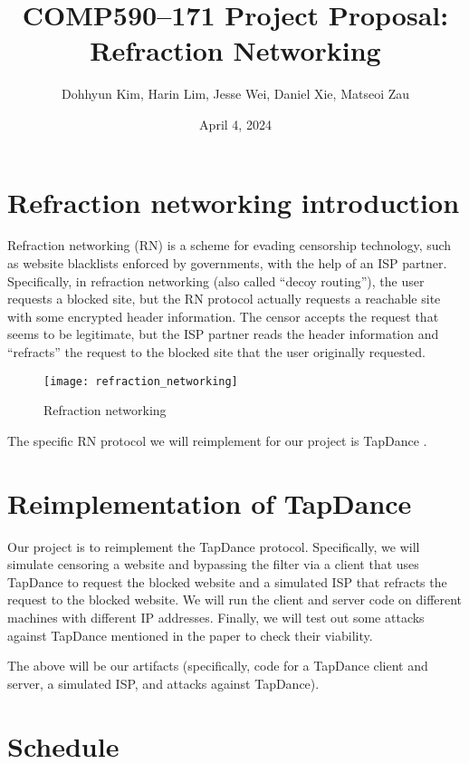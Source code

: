 \documentclass{article}
\title{COMP590--171 Project Proposal: Refraction Networking}
\author{Dohhyun Kim, Harin Lim, Jesse Wei, Daniel Xie, Matseoi Zau}
\date{April 4, 2024}
\begin{document}
\maketitle

\section{Refraction networking introduction}

Refraction networking (RN) is a scheme for evading censorship technology, such as website blacklists enforced by governments, with the help of an ISP partner. Specifically, in refraction networking (also called ``decoy routing''), the user requests a blocked site, but the RN protocol actually requests a reachable site with some encrypted header information. The censor accepts the request that seems to be legitimate, but the ISP partner reads the header information and ``refracts'' the request to the blocked site that the user originally requested.

\begin{figure}[h]
    \centering
    \texttt{[image: refraction\_networking]}
    \caption{Refraction networking \cite{refraction_network}}
\end{figure}

The specific RN protocol we will reimplement for our project is TapDance \cite{tapdance}.

\section{Reimplementation of TapDance}

Our project is to reimplement the TapDance protocol. Specifically, we will simulate censoring a website and bypassing the filter via a client that uses TapDance to request the blocked website and a simulated ISP that refracts the request to the blocked website. We will run the client and server code on different machines with different IP addresses. Finally, we will test out some attacks against TapDance mentioned in the paper to check their viability.

The above will be our artifacts (specifically, code for a TapDance client and server, a simulated ISP, and attacks against TapDance).

\section{Schedule}
\end{document}
